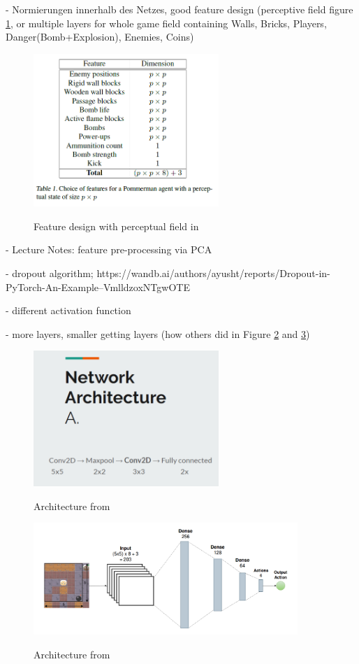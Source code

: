 \documentclass[a4paper ,12pt]{report}
\begin{document}
	- Normierungen innerhalb des Netzes, good feature design (perceptive field figure \ref{fig:feat1}, or multiple layers for whole game field containing Walls, Bricks, Players, Danger(Bomb+Explosion), Enemies, Coins)
	
	\begin{figure}[ht]
		\caption{Feature design with perceptual field in \cite{Pommerman}}
		\includegraphics[width=7cm]{features_with_perceptual_field.png}
		\label{fig:feat1}
	\end{figure}
	
	- Lecture Notes: feature pre-processing via PCA
	
	- dropout algorithm; https://wandb.ai/authors/ayusht/reports/Dropout-in-PyTorch-An-Example--VmlldzoxNTgwOTE
	
	- different activation function
	
	- more layers, smaller getting layers (how others did in Figure \ref{fig:arch1} and \ref{fig:arch2})
	
	\begin{figure}[ht]
		\caption{Architecture from \cite{AlanPresentation}}
		\includegraphics[width=7cm]{architecture.png}
		\label{fig:arch1}
	\end{figure}

	\begin{figure}[ht]
		\caption{Architecture from \cite{Pommerman}}
		\includegraphics[width=10cm]{architecture_2.png}
		\label{fig:arch2}
	\end{figure}
	
\end{document}
